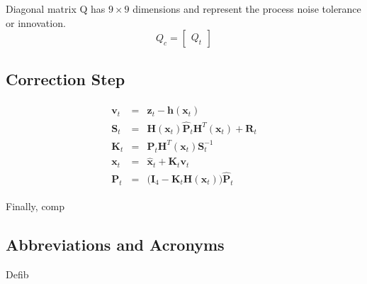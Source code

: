 \documentclass[letterpaper, 10 pt, conference]{ieeeconf}  %
\begin{document}






Diagonal matrix Q has \( 9 \times 9\) dimensions and represent the process
noise tolerance or innovation.
\begin{equation}
Q_{c} =
        \begin{bmatrix}
                Q_{t}
        \end{bmatrix}
\end{equation}

\subsection{Correction Step}
\begin{equation}
\begin{split}\begin{array}{rcl}
        \mathbf{v}_t &=& \mathbf{z}_t - \mathbf{h}(\mathbf{x}_t) \\
        \mathbf{S}_t &=& \mathbf{H}(\mathbf{x}_t) \hat{\mathbf{P}}_t \mathbf{H}^T(\mathbf{x}_t) + \mathbf{R}_t \\
        \mathbf{K}_t &=& \hat{\mathbf{P}}_t \mathbf{H}^T(\mathbf{x}_t) \mathbf{S}_t^{-1} \\
        \mathbf{x}_t &=& \hat{\mathbf{x}}_t + \mathbf{K}_t \mathbf{v}_t \\
        \mathbf{P}_t &=& \big(\mathbf{I}_4 - \mathbf{K}_t\mathbf{H}(\mathbf{x}_t)\big)\hat{\mathbf{P}}_t
\end{array}\end{split}
\end{equation}









Finally, comp

\subsection{Abbreviations and Acronyms}
Defib
\end{document}
